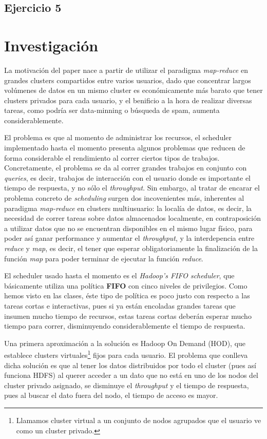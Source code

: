 \documentclass[a4paper]{article}
\begin{document}
\subsection{Ejercicio 5}


\newpage
\section{Investigación}

La motivación del paper nace a partir de utilizar el paradigma \textit{map-reduce} en grandes clusters compartidos entre varios usuarios, dado que concentrar largos volúmenes de datos en un mismo cluster es económicamente más barato que tener clusters privados para cada usuario, y el benificio a la hora de realizar diversas tareas, como podría ser data-minning o búsqueda de spam, aumenta considerablemente.

El problema es que al momento de administrar los recursos, el scheduler implementado hasta el momento presenta algunos problemas que reducen de forma considerable el rendimiento al correr ciertos tipos de trabajos. Concretamente, el problema se da al correr grandes trabajos en conjunto con \textit{queries}, es decir, trabajos de interacción con el usuario donde es importante el tiempo de respuesta, y no sólo el \textit{throughput}. Sin embargo, al tratar de encarar el problema concreto de \textit{scheduling} surgen dos incovenientes más, inherentes al paradigma \textit{map-reduce} en clusters multiusuario: la localía de datos, es decir, la necesidad de correr tareas sobre datos almacenados localmente, en contraposición a utilizar datos que no se encuentran disponibles en el mismo lugar físico, para poder así ganar performance y aumentar el \textit{throughput}, y la interdepencia entre \textit{reduce} y \textit{map}, es decir, el tener que esperar obligatoriamente la finalización de la función \textit{map} para poder terminar de ejecutar la función \textit{reduce}.

El scheduler usado hasta el momento es el \textit{Hadoop's FIFO scheduler}, que básicamente utiliza una política \textbf{FIFO} con cinco niveles de privilegios.  Como hemos visto en las clases, éste tipo de política es poco justo con respecto a las tareas cortas e interactivas, pues si ya están encoladas grandes tareas que insumen mucho tiempo de recursos, estas tareas cortas deberán esperar mucho tiempo para correr, disminuyendo considerablemente el tiempo de respuesta.

Una primera aproximación a la solución es Hadoop On Demand (HOD), que establece clusters virtuales\footnote{Llamamos cluster virtual a un conjunto de nodos agrupados que el usuario ve como un cluster privado.} fijos para cada usuario. El problema que conlleva dicha solución es que al tener los datos distribuidos por todo el cluster (pues así funciona HDFS) al querer acceder a un dato que no está en uno de los nodos del cluster privado asignado, se disminuye el \textit{throughput} y el tiempo de respuesta, pues al buscar el dato fuera del nodo, el tiempo de acceso es mayor.
\end{document}
